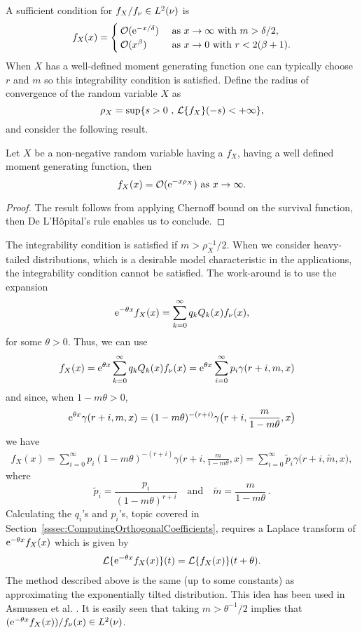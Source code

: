 A sufficient condition for $f_{X}/f_{\nu}\in L^2(\nu)$ is
\begin{equation*}\label{eq:IntegrabilityCondition}
f_{X}(x)=
\begin{cases}
{\mathcal{O}}(\mathrm{e}^{- x/\delta})&\text{ as }x\rightarrow\infty\text{ with }m>\delta/2,\\
{\mathcal{O}}(x^{\beta})&\text{  as }x\rightarrow0\text{ with } r < 2( \beta + 1).
\end{cases}
\end{equation*}
When $X$ has a well-defined moment generating function one can typically choose $r$ and $m$ so this integrability condition is satisfied. Define the radius of convergence of the random variable $X$ as
$$
\rho_X=\sup\{s>0\text{ , }\mathcal{L}\{f_{X}\}(-s)<+\infty\},
$$
and consider the following result.
\begin{proposition}\label{prop:ExpBound}
Let $X$ be a non-negative random variable having a \pdf $f_X$, having a well defined moment generating function, then
$$
f_X(x)={\mathcal{O}}(\mathrm{e}^{- x\rho_X})\text{ as }x\rightarrow\infty.
$$
\end{proposition}
\begin{proof}
The result follows from applying Chernoff bound on the survival function, then De L'H\^opital's rule enables us to conclude.
\end{proof}
The integrability condition is satisfied if $m>\rho_X^{-1}/2$. When we consider heavy-tailed distributions, which is a desirable model characteristic in the applications, the integrability condition cannot be satisfied. The work-around is to use the expansion
\[ \mathrm{e}^{-\theta x} f_{X}(x)
= \sum_{k=0}^\infty q_k Q_k(x) f_\nu(x),  \]
for some $\theta > 0$. Thus, we can use
\begin{align*}
f_{X}(x)
&= \mathrm{e}^{\theta x} \sum_{k=0}^\infty q_k Q_k(x) f_\nu(x)
=  \mathrm{e}^{\theta x} \sum_{i=0}^{\infty} p_i \gamma(r+i,m,x)
\end{align*}
and since, when $1-m \theta > 0$,
\[ \mathrm{e}^{\theta x} \gamma(r+i, m, x) = (1-m \theta)^{-(r+i)} \gamma\big(r+i, \frac{m}{1-m\theta}, x \big)  \]
we have
\begin{align*}
f_{X}(x)
= \sum_{i=0}^{\infty} p_i (1-m \theta)^{-(r+i)} \gamma\big(r+i, \frac{m}{1-m\theta}, x \big)
= \sum_{i=0}^{\infty} \widetilde{p}_i \gamma\big(r+i, \widetilde{m}, x \big),
\end{align*}
where
\[ \widetilde{p}_i = \frac{ p_i }{(1-m \theta)^{r+i}}
\quad\text{and}\quad
\widetilde{m} = \frac{m}{1-m\theta} \,.
\]
Calculating the $q_i$'s and $p_i$'s, topic covered in Section~\ref{sssec:ComputingOrthogonalCoefficients}, requires a Laplace transform of $\mathrm{e}^{-\theta x} f_{X}(x)$ which is given by
\begin{align*}
\mathcal{L}\{ \mathrm{e}^{-\theta x} f_{X}(x) \}(t)
= \mathcal{L}\{ f_{X}(x) \}(t+\theta).
\end{align*}
The method described above is the same (up to some constants) as approximating the exponentially tilted distribution.
This idea has been used in Asmussen et al. \cite{asmussen2016orthonormal}.
It is easily seen that taking $m >\theta^{-1}/2$ implies that $(\mathrm{e}^{-\theta x} f_{X}(x))/f_{\nu}(x)\in L^2(\nu)$.

